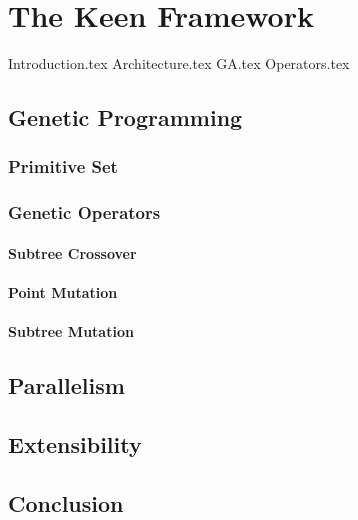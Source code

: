 \chapter{The Keen Framework}
\label{chap:keen}
  {Introduction.tex}
  {Architecture.tex}
  {GA.tex}
  {Operators.tex}
  \section{Genetic Programming}
  \label{sec:genetic_programming}
    \subsection{Primitive Set}
    \label{sec:keen:gp:primitive_set}
      \Blindtext
    \subsection{Genetic Operators}
    \label{sec:keen:gp:operators}
      \subsubsection{Subtree Crossover}
      \label{sec:keen:gp:operators:crossover:subtree}
        \Blindtext
      \subsubsection{Point Mutation}
      \label{sec:keen:gp:operators:mutation:point}
        \Blindtext
      \subsubsection{Subtree Mutation}
      \label{sec:keen:operators:mutation:subtree}
        \Blindtext
  \section{Parallelism}
  \label{sec:parallelism}
    \Blindtext
  \section{Extensibility}
  \label{sec:extensibility}
    \Blindtext
  \section{Conclusion}
  \label{sec:conclusion}
    \Blindtext

